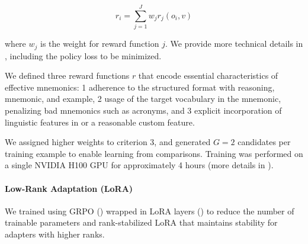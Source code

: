 \begin{equation}
r_i = \sum_{j=1}^{J} w_j r_j(o_i, v)
\end{equation}

where $w_j$ is the weight for reward function $j$. We provide more technical details in , including the policy loss to be minimized.

We defined three reward functions $r$ that encode essential characteristics of effective mnemonics:
\numlist{1} adherence to the structured format with reasoning, mnemonic, and example,
\numlist{2} usage of the target vocabulary in the mnemonic, penalizing bad mnemonics such as acronyms, and
\numlist{3} explicit incorporation of linguistic features in  or a reasonable custom feature.

We assigned higher weights to criterion 3, and generated $G=2$ candidates per training example to enable learning from comparisons. Training was performed on a single NVIDIA H100 GPU for approximately 4 hours (more details in ).

\paragraph*{Low-Rank Adaptation (LoRA)} We trained \studentmodel using GRPO () wrapped in LoRA layers () to reduce the number of trainable parameters and rank-stabilized LoRA that maintains stability for adapters with higher ranks.
